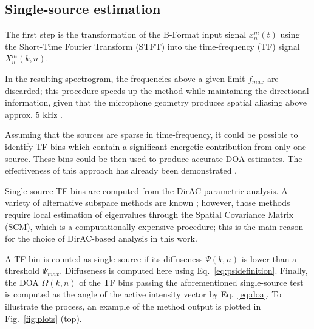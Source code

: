 \subsection{Single-source estimation}

The first step is the transformation of the B-Format input signal $x_n^m(t)$ using the Short-Time Fourier Transform (STFT) into the time-frequency (TF) signal $X_n^m(k,n)$.

In the resulting spectrogram, the frequencies above a given limit $f_{max}$ are discarded; this procedure speeds up the method while maintaining the directional information, given that the microphone geometry produces spatial aliasing above approx. 5 kHz \cite{Bertet2006}.

Assuming that the sources are sparse in time-frequency, it could be possible to identify TF bins which contain a significant energetic contribution from only one source.
These bins could be then used to produce accurate DOA estimates. The effectiveness of this approach has already been demonstrated \cite{tho2014robust, nguyen2020sequence}.

Single-source TF bins are computed from the DirAC parametric analysis.
A variety of alternative subspace methods are known \cite{epain2016spherical, madmoni2018direction}; however, those methods require local estimation of eigenvalues through the Spatial Covariance Matrix (SCM), which is a computationally expensive procedure;
this is the main reason for the choice of DirAC-based analysis in this work. 

A TF bin is counted as single-source if its diffuseness $\Psi(k,n)$ is lower than a threshold $\Psi_{max}$. Diffuseness is computed here using Eq.~\ref{eq:psidefinition}. 
 Finally, the DOA $\Omega(k,n)$ of the TF bins passing the aforementioned single-source test is computed as the angle of the active intensity vector by Eq.~\ref{eq:doa}.
 To illustrate the process, an example of the method output is plotted in Fig.~\ref{fig:plots} (top).

